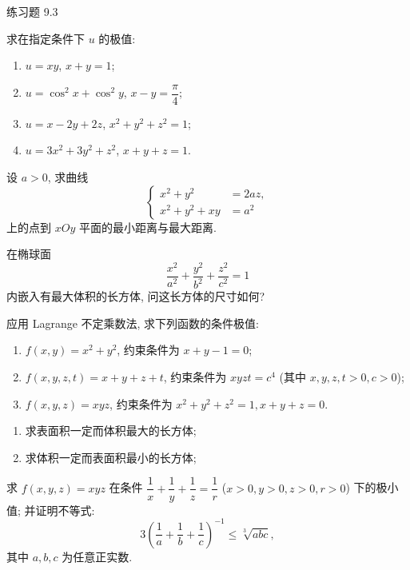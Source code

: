 \begin{exblock}{练习题 9.3}
  \item 求在指定条件下 $u$ 的极值:
  \begin{enumerate}
    \item $u = xy$, $x + y = 1$;
    \item $u = \cos^{2}x + \cos^{2}y$, $x - y = \dfrac{\pi}{4}$;
    \item $u = x - 2y + 2z$, $x^{2} + y^{2} + z^{2} = 1$;
    \item $u = 3x^{2} + 3y^{2} + z^{2}$, $x + y + z = 1$.
  \end{enumerate}

  \item 设 $a > 0$, 求曲线
  \[
    \left\{\begin{aligned}
      x^{2} + y^{2} &= 2az, \\
      x^{2} + y^{2} + xy &= a^{2}
    \end{aligned}\right.
  \]
  上的点到 $xOy$ 平面的最小距离与最大距离.

  \item 在椭球面
  \[
    \frac{x^{2}}{a^{2}} + \frac{y^{2}}{b^{2}} + \frac{z^{2}}{c^{2}} = 1
  \]
  内嵌入有最大体积的长方体, 问这长方体的尺寸如何?

  \item 应用 Lagrange 不定乘数法, 求下列函数的条件极值:
  \begin{enumerate}
    \item $f(x, y) = x^{2} + y^{2}$, 约束条件为 $x + y - 1 = 0$;
    \item $f(x, y, z, t) = x + y + z + t$, 约束条件为 $xyzt = c^{4}$ (其中 $x, y, z, t > 0, c > 0$);
    \item $f(x, y, z) = xyz$, 约束条件为 $x^{2} + y^{2} + z^{2} = 1, x + y + z = 0$.
  \end{enumerate}

  \item 
  \begin{enumerate}
    \item 求表面积一定而体积最大的长方体;
    \item 求体积一定而表面积最小的长方体;
  \end{enumerate}

  \item 求 $f(x, y, z) = xyz$ 在条件 $\dfrac{1}{x} + \dfrac{1}{y} + \dfrac{1}{z} = \dfrac{1}{r}$ ($x > 0, y > 0, z > 0, r > 0$) 下的极小值; 并证明不等式:
  \[
    3\left(\frac{1}{a} + \frac{1}{b} + \frac{1}{c}\right)^{-1} \leqslant \sqrt[3]{abc},
  \]
  其中 $a, b, c$ 为任意正实数.


\end{exblock}

